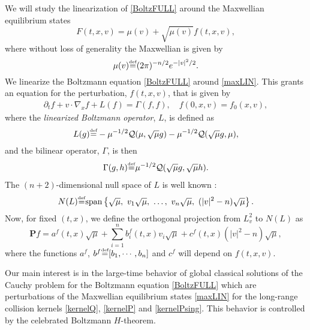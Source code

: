 \documentclass{amsart}
\numberwithin{equation}{section}
\begin{document}
 We will study the linearization of \eqref{BoltzFULL} around the Maxwellian equilibrium states 
\begin{equation}
F(t,x,v) = {\mu}(v)+\sqrt{{\mu}(v)} f(t,x,v),
\label{maxLIN}
\end{equation}
where without loss of generality the Maxwellian is given by
$$
{\mu}(v) {\overset{\mbox{\tiny{def}}}{=}} (2\pi)^{-n/2}e^{-|v|^2/2}.
$$
We linearize the Boltzmann equation \eqref{BoltzFULL} around \eqref{maxLIN}.  This grants an equation for the perturbation, $f(t,x,v)$, that is given by
\begin{gather}
 \partial_t f + v\cdot \nabla_x f + {L} (f)
=
{\Gamma} (f,f),
\quad
f(0, x, v) = f_0(x,v),
\label{Boltz}
\end{gather}
where the {\it linearized Boltzmann operator}, ${L}$, is defined as
$$
 {L}(g)
 {\overset{\mbox{\tiny{def}}}{=}}  
- {\mu}^{-1/2}\mathcal{Q}({\mu} ,{\sqrt{\mu}} g)- {\mu}^{-1/2}\mathcal{Q}({\sqrt{\mu}} g,{\mu}),
$$
and the bilinear operator, $\Gamma$, is then
\begin{gather}
\Gamma (g,h)
{\overset{\mbox{\tiny{def}}}{=}}
 {\mu}^{-1/2}\mathcal{Q}({\sqrt{\mu}} g,{\sqrt{\mu}} h).
\label{gamma0}
\end{gather}
The $({n}+2)$-dimensional null space of ${L}$ is well known \cite{MR1379589}: 
\begin{equation}\label{nullLsp}
    {N({L})} {\overset{\mbox{\tiny{def}}}{=}} {\rm span}\left\{\sqrt{\mu}, ~  {v}_1\sqrt{\mu}, ~\ldots, ~  {v}_{n}\sqrt{\mu}, ~   (|{v}|^2-{n})\sqrt{\mu} \right\}.
\end{equation}
Now, for fixed $(t,x)$, we define the orthogonal projection from
$L^2_{v}$ to ${N({L})}$ as
\begin{equation}
 {\mathbf{P}} f=a^f(t,x)\sqrt{\mu}
    +\sum_{i=1}^{n}
    b^f_i(t,x){v}_i\sqrt{\mu}+c^f(t,x)(|{v}|^2-{n})\sqrt{\mu}, \label{form.p}
\end{equation}
where the functions $a^f$, $b^f{\overset{\mbox{\tiny{def}}}{=}} [b_1,\cdots,b_n]$ and $c^f$ will depend on ${f}(t,x,{v})$. 

 
 Our main interest is in the large-time behavior of global classical solutions of the Cauchy problem for the Boltzmann equation \eqref{BoltzFULL} which are perturbations of the Maxwellian equilibrium states \eqref{maxLIN} for the long-range collision kernels \eqref{kernelQ}, \eqref{kernelP} and \eqref{kernelPsing}.  This behavior is controlled by the celebrated Boltzmann $H$-theorem. 
 
\end{document}
